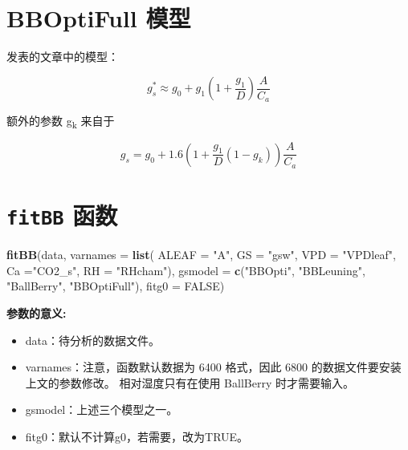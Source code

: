 \documentclass[]{krantz}
\makeatletter
\newenvironment{Shaded}{\begin{snugshade}}{\end{snugshade}}
\newcommand{\KeywordTok}[1]{\textcolor[rgb]{0.13,0.29,0.53}{\textbf{#1}}}
\newcommand{\DataTypeTok}[1]{\textcolor[rgb]{0.13,0.29,0.53}{#1}}
\newcommand{\StringTok}[1]{\textcolor[rgb]{0.31,0.60,0.02}{#1}}
\newcommand{\OtherTok}[1]{\textcolor[rgb]{0.56,0.35,0.01}{#1}}
\newcommand{\NormalTok}[1]{#1}
\providecommand{\tightlist}{%
  \setlength{\itemsep}{0pt}\setlength{\parskip}{0pt}}
\newenvironment{kframe}{%
\medskip{}
\setlength{\fboxsep}{.8em}
 \def\at@end@of@kframe{}%
 \ifinner\ifhmode%
  \def\at@end@of@kframe{\end{minipage}}%
  \begin{minipage}{\columnwidth}%
 \fi\fi%
 \def\FrameCommand##1{\hskip\@totalleftmargin \hskip-\fboxsep
 \colorbox{shadecolor}{##1}\hskip-\fboxsep
     \hskip-\linewidth \hskip-\@totalleftmargin \hskip\columnwidth}%
 \MakeFramed {\advance\hsize-\width
   \@totalleftmargin\z@ \linewidth\hsize
   \@setminipage}}%
 {\par\unskip\endMakeFramed%
 \at@end@of@kframe}
\renewenvironment{Shaded}{\begin{kframe}}{\end{kframe}}
\theoremstyle{definition}
\theoremstyle{definition}
\theoremstyle{definition}
\theoremstyle{remark}
\makeatother
\begin{document}
\section{BBOptiFull 模型}\label{bboptifull}

\citet{Medlyn2011Reconciling} 发表的文章中的模型：

\begin{equation}
g_s^* \approx g_0 + g_1(1 + \frac{g_1}{D}) \frac{A}{C_a}
\label{eq:BBOptiFull}
\end{equation}

额外的参数 g\textsubscript{k} 来自于 \citet{Duursma2013Near}

\begin{equation}
g_s = g_0 + 1.6(1 + \frac{g_1}{D}(1-g_k)) \frac{A}{C_a}
\label{eq:Duursm}
\end{equation}

\section{\texorpdfstring{\texttt{fitBB}
函数}{fitBB 函数}}\label{fitbb-p}

\begin{Shaded}
\begin{Highlighting}[]
\KeywordTok{fitBB}\NormalTok{(data, }\DataTypeTok{varnames =} \KeywordTok{list}\NormalTok{(}
  \DataTypeTok{ALEAF =} \StringTok{"A"}\NormalTok{, }\DataTypeTok{GS =} \StringTok{"gsw"}\NormalTok{, }\DataTypeTok{VPD =} \StringTok{"VPDleaf"}\NormalTok{,}
  \DataTypeTok{Ca =}\StringTok{"CO2_s"}\NormalTok{, }\DataTypeTok{RH =} \StringTok{"RHcham"}\NormalTok{), }
  \DataTypeTok{gsmodel =} \KeywordTok{c}\NormalTok{(}\StringTok{"BBOpti"}\NormalTok{, }\StringTok{"BBLeuning"}\NormalTok{, }\StringTok{"BallBerry"}\NormalTok{,}
              \StringTok{"BBOptiFull"}\NormalTok{), }\DataTypeTok{fitg0 =} \OtherTok{FALSE}\NormalTok{)}
\end{Highlighting}
\end{Shaded}

\textbf{参数的意义:}

\begin{itemize}
\tightlist
\item
  data：待分析的数据文件。
\item
  varnames：注意，函数默认数据为 6400 格式，因此 6800
  的数据文件要安装上文的参数修改。 相对湿度只有在使用 BallBerry
  时才需要输入。
\item
  gsmodel：上述三个模型之一。
\item
  fitg0：默认不计算g0，若需要，改为TRUE。
\end{itemize}
\end{document}
